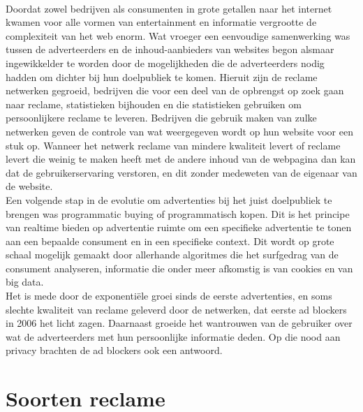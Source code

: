 \documentclass[pdftex,a4paper,12pt,twoside]{report}
\begin{document}
\\
Doordat zowel bedrijven als consumenten in grote getallen naar het internet kwamen voor alle vormen van entertainment en informatie vergrootte de complexiteit van het web enorm. Wat vroeger een eenvoudige samenwerking was tussen de adverteerders en de inhoud-aanbieders van websites begon alsmaar ingewikkelder te worden door de mogelijkheden die de adverteerders nodig hadden om dichter bij hun doelpubliek te komen. Hieruit zijn de reclame netwerken gegroeid, bedrijven die voor een deel van de opbrengst op zoek gaan naar reclame, statistieken bijhouden en die statistieken gebruiken om persoonlijkere reclame te leveren. Bedrijven die gebruik maken van zulke netwerken geven de controle van wat weergegeven wordt op hun website voor een stuk op. Wanneer het netwerk reclame van mindere kwaliteit levert of reclame levert die weinig te maken heeft met de andere inhoud van de webpagina dan kan dat de gebruikerservaring verstoren, en dit zonder medeweten van de eigenaar van de website.
\\
Een volgende stap in de evolutie om advertenties bij het juist doelpubliek te brengen was programmatic buying of programmatisch kopen. Dit is het principe van realtime bieden op advertentie ruimte om een specifieke advertentie te tonen aan een bepaalde consument en in een specifieke context. Dit wordt op grote schaal mogelijk gemaakt door allerhande algoritmes die het surfgedrag van de consument analyseren, informatie die onder meer afkomstig is van cookies en van big data.
\\
Het is mede door de exponentiële groei sinds de eerste advertenties, en soms slechte kwaliteit van reclame geleverd door de netwerken, dat eerste ad blockers in 2006 het licht zagen. Daarnaast groeide het wantrouwen van de gebruiker over wat de adverteerders met hun persoonlijke informatie deden. Op die nood aan privacy brachten de ad blockers ook een antwoord.

\section{Soorten reclame}
\label{sec:Soorten reclame}
\end{document}

